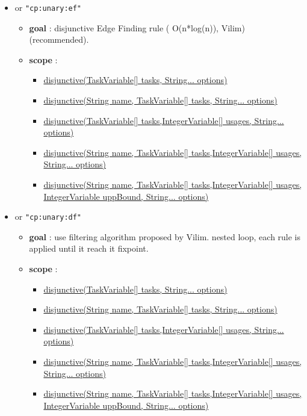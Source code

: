 \begin{itemize}
				\item \label{cdisjunctiveef:cdisjunctiveefoptions}\hypertarget{cdisjunctiveef:cdisjunctiveefoptions}{}		
		 or \texttt{"cp:unary:ef"}
		\begin{itemize}
				\item \textbf{goal} : disjunctive Edge Finding rule ( O(n*log(n)), Vilim) (recommended).
				\item \textbf{scope} : 
					\begin{itemize}
						\item \hyperlink{disjunctive:disjunctiveconstraint}{disjunctive(TaskVariable[] tasks, String... options) }
						\item \hyperlink{disjunctive:disjunctiveconstraint}{disjunctive(String name, TaskVariable[] tasks, String... options)}													\item \hyperlink{disjunctive:disjunctiveconstraint}{disjunctive(TaskVariable[] tasks,IntegerVariable[] usages, String... options)}
						\item \hyperlink{disjunctive:disjunctiveconstraint}{disjunctive(String name, TaskVariable[] tasks,IntegerVariable[] usages, String... options)}							
						\item \hyperlink{disjunctive:disjunctiveconstraint}{disjunctive(String name, TaskVariable[] tasks,IntegerVariable[] usages, IntegerVariable uppBound, String... options)}
					\end{itemize}
		\end{itemize}

		\item \label{cdisjunctivedf:cdisjunctivedfoptions}\hypertarget{cdisjunctivedf:cdisjunctivedfoptions}{}				
		 or \texttt{"cp:unary:df"}
		\begin{itemize}
				\item \textbf{goal} : use filtering algorithm proposed by Vilim. nested loop, each rule is applied until it reach it fixpoint.
				\item \textbf{scope} : 
					\begin{itemize}
						\item \hyperlink{disjunctive:disjunctiveconstraint}{disjunctive(TaskVariable[] tasks, String... options) }
						\item \hyperlink{disjunctive:disjunctiveconstraint}{disjunctive(String name, TaskVariable[] tasks, String... options)}													\item \hyperlink{disjunctive:disjunctiveconstraint}{disjunctive(TaskVariable[] tasks,IntegerVariable[] usages, String... options)}
						\item \hyperlink{disjunctive:disjunctiveconstraint}{disjunctive(String name, TaskVariable[] tasks,IntegerVariable[] usages, String... options)}							
						\item \hyperlink{disjunctive:disjunctiveconstraint}{disjunctive(String name, TaskVariable[] tasks,IntegerVariable[] usages, IntegerVariable uppBound, String... options)}
					\end{itemize}
		\end{itemize}
		

\end{itemize}
